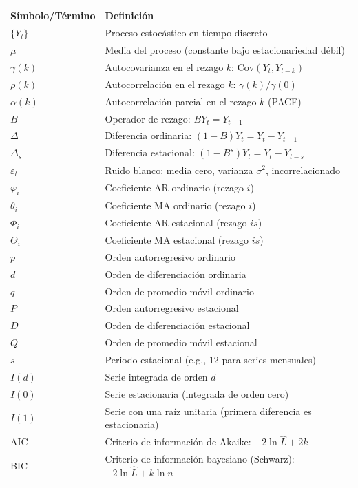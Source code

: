 \documentclass[12pt,a4paper]{article}
\theoremstyle{definition}
\begin{document}
\begin{longtable}{p{2.5cm}p{9cm}}
\toprule
\textbf{Símbolo/Término} & \textbf{Definición} \\
\midrule
\endhead
$\{Y_t\}$ & Proceso estocástico en tiempo discreto \\
$\mu$ & Media del proceso (constante bajo estacionariedad débil) \\
$\gamma(k)$ & Autocovarianza en el rezago $k$: $\mathrm{Cov}(Y_t, Y_{t-k})$ \\
$\rho(k)$ & Autocorrelación en el rezago $k$: $\gamma(k)/\gamma(0)$ \\
$\alpha(k)$ & Autocorrelación parcial en el rezago $k$ (PACF) \\
$B$ & Operador de rezago: $BY_t = Y_{t-1}$ \\
$\Delta$ & Diferencia ordinaria: $(1-B)Y_t = Y_t - Y_{t-1}$ \\
$\Delta_s$ & Diferencia estacional: $(1-B^s)Y_t = Y_t - Y_{t-s}$ \\
$\varepsilon_t$ & Ruido blanco: media cero, varianza $\sigma^2$, incorrelacionado \\
$\varphi_i$ & Coeficiente AR ordinario (rezago $i$) \\
$\theta_i$ & Coeficiente MA ordinario (rezago $i$) \\
$\Phi_i$ & Coeficiente AR estacional (rezago $is$) \\
$\Theta_i$ & Coeficiente MA estacional (rezago $is$) \\
$p$ & Orden autorregresivo ordinario \\
$d$ & Orden de diferenciación ordinaria \\
$q$ & Orden de promedio móvil ordinario \\
$P$ & Orden autorregresivo estacional \\
$D$ & Orden de diferenciación estacional \\
$Q$ & Orden de promedio móvil estacional \\
$s$ & Periodo estacional (e.g., 12 para series mensuales) \\
$I(d)$ & Serie integrada de orden $d$ \\
$I(0)$ & Serie estacionaria (integrada de orden cero) \\
$I(1)$ & Serie con una raíz unitaria (primera diferencia es estacionaria) \\
AIC & Criterio de información de Akaike: $-2\ln\hat{L} + 2k$ \\
BIC & Criterio de información bayesiano (Schwarz): $-2\ln\hat{L} + k\ln n$ \\

\end{longtable}
\end{document}
